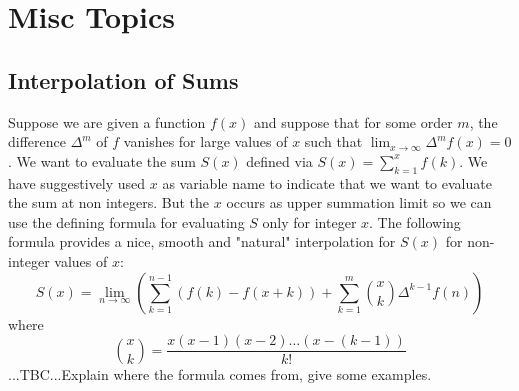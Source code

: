 



\section{Misc Topics}

\subsection{Interpolation of Sums}
Suppose we are given a function $f(x)$ and suppose that for some order $m$, the difference $\Delta^m$ of $f$ vanishes for large values of $x$ such that $\lim_{x \rightarrow \infty} \Delta^m f(x) = 0$. We want to evaluate the sum $S(x)$ defined via $S(x) = \sum_{k=1}^{x} f(k)$. We have suggestively used $x$ as variable name to indicate that we want to evaluate the sum at non integers. But the $x$ occurs as upper summation limit so we can use the defining formula for evaluating $S$ only for integer $x$. The following formula provides a nice, smooth and "natural" interpolation for $S(x)$ for non-integer values of $x$:
\begin{equation}
S(x) = \lim_{n \rightarrow \infty} 
\left(   \sum_{k=1}^{n-1} \left(f(k) - f(x+k) \right) 
       + \sum_{k=1}^{m} \binom{x}{k} \Delta^{k-1} f(n)  \right)
\end{equation}
where
\begin{equation}
\binom{x}{k} = \frac{x (x-1) (x-2) \ldots (x-(k-1)) }{k!}
\end{equation}
...TBC...Explain where the formula comes from, give some examples.



